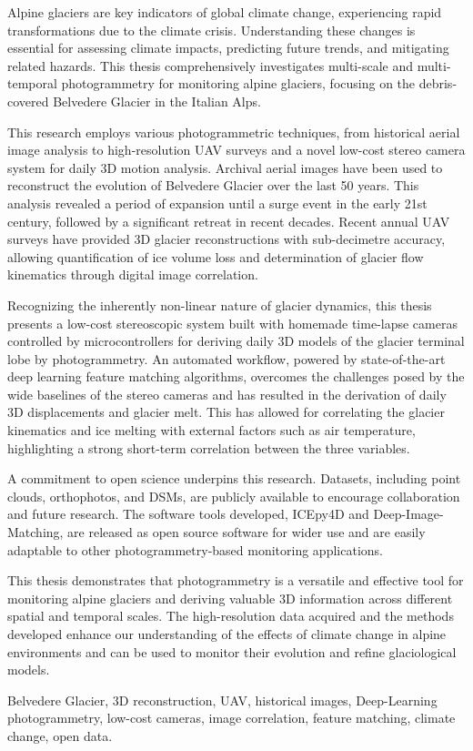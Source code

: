 Alpine glaciers are key indicators of global climate change, experiencing rapid transformations due to the climate crisis. 
Understanding these changes is essential for assessing climate impacts, predicting future trends, and mitigating related hazards.
This thesis comprehensively investigates multi-scale and multi-temporal photogrammetry for monitoring alpine glaciers, focusing on the debris-covered Belvedere Glacier in the Italian Alps.

This research employs various photogrammetric techniques, from historical aerial image analysis to high-resolution UAV surveys and a novel low-cost stereo camera system for daily 3D motion analysis.
Archival aerial images have been used to reconstruct the evolution of Belvedere Glacier over the last 50 years. 
This analysis revealed a period of expansion until a surge event in the early 21st century, followed by a significant retreat in recent decades.
Recent annual UAV surveys have provided 3D glacier reconstructions with sub-decimetre accuracy, allowing quantification of ice volume loss and determination of glacier flow kinematics through digital image correlation.

Recognizing the inherently non-linear nature of glacier dynamics, this thesis presents a low-cost stereoscopic system built with homemade time-lapse cameras controlled by microcontrollers for deriving daily 3D models of the glacier terminal lobe by photogrammetry.
An automated workflow, powered by state-of-the-art deep learning feature matching algorithms, overcomes the challenges posed by the wide baselines of the stereo cameras and has resulted in the derivation of daily 3D displacements and glacier melt.
This has allowed for correlating the glacier kinematics and ice melting with external factors such as air temperature, highlighting a strong short-term correlation between the three variables. 

A commitment to open science underpins this research. 
Datasets, including point clouds, orthophotos, and DSMs, are publicly available to encourage collaboration and future research. 
The software tools developed, ICEpy4D and Deep-Image-Matching, are released as open source software for wider use and are easily adaptable to other photogrammetry-based monitoring applications.

This thesis demonstrates that photogrammetry is a versatile and effective tool for monitoring alpine glaciers and deriving valuable 3D information across different spatial and temporal scales. 
The high-resolution data acquired and the methods developed enhance our understanding of the effects of climate change in alpine environments and can be used to monitor their evolution and refine glaciological models.

\vspace{5pt}
 Belvedere Glacier, 3D reconstruction, UAV, historical images, Deep-Learning photogrammetry, low-cost cameras, image correlation, feature matching, climate change, open data.